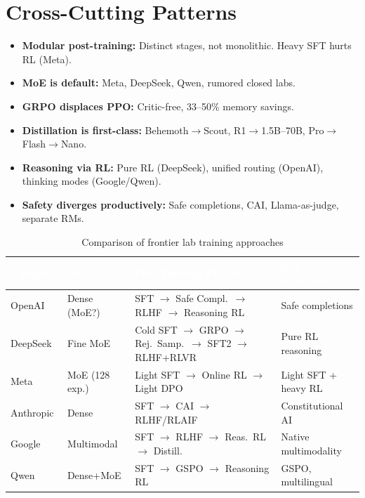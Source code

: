 \section{Cross-Cutting Patterns}

\begin{patternbox}
\begin{itemize}
  \item \textbf{Modular post-training:} Distinct stages, not monolithic. Heavy SFT hurts RL (Meta).
  \item \textbf{MoE is default:} Meta, DeepSeek, Qwen, rumored closed labs.
  \item \textbf{GRPO displaces PPO:} Critic-free, 33--50\% memory savings.
  \item \textbf{Distillation is first-class:} Behemoth$\rightarrow$Scout, R1$\rightarrow$1.5B--70B, Pro$\rightarrow$Flash$\rightarrow$Nano.
  \item \textbf{Reasoning via RL:} Pure RL (DeepSeek), unified routing (OpenAI), thinking modes (Google/Qwen).
  \item \textbf{Safety diverges productively:} Safe completions, CAI, Llama-as-judge, separate RMs.
\end{itemize}
\end{patternbox}

\begin{table}[H]
\centering\small\sffamily
{}
\begin{tabular}{L{1.6cm}L{2.2cm}L{3.8cm}L{2.8cm}}
\toprule
{}\textcolor{white}{\textbf{Company}} & \textcolor{white}{\textbf{Arch.}} & \textcolor{white}{\textbf{Post-Training Pipeline}} & \textcolor{white}{\textbf{Key Innovation}} \\
\midrule
OpenAI & Dense (MoE?) & SFT $\rightarrow$ Safe Compl.\ $\rightarrow$ RLHF $\rightarrow$ Reasoning RL & Safe completions \\
DeepSeek & Fine MoE & Cold SFT $\rightarrow$ GRPO $\rightarrow$ Rej.\ Samp.\ $\rightarrow$ SFT2 $\rightarrow$ RLHF+RLVR & Pure RL reasoning \\
Meta & MoE (128 exp.) & Light SFT $\rightarrow$ Online RL $\rightarrow$ Light DPO & Light SFT + heavy RL \\
Anthropic & Dense & SFT $\rightarrow$ CAI $\rightarrow$ RLHF/RLAIF & Constitutional AI \\
Google & Multimodal & SFT $\rightarrow$ RLHF $\rightarrow$ Reas.\ RL $\rightarrow$ Distill. & Native multimodality \\
Qwen & Dense+MoE & SFT $\rightarrow$ GSPO $\rightarrow$ Reasoning RL & GSPO, multilingual \\
\bottomrule
\end{tabular}
\caption{Comparison of frontier lab training approaches}
\end{table}


